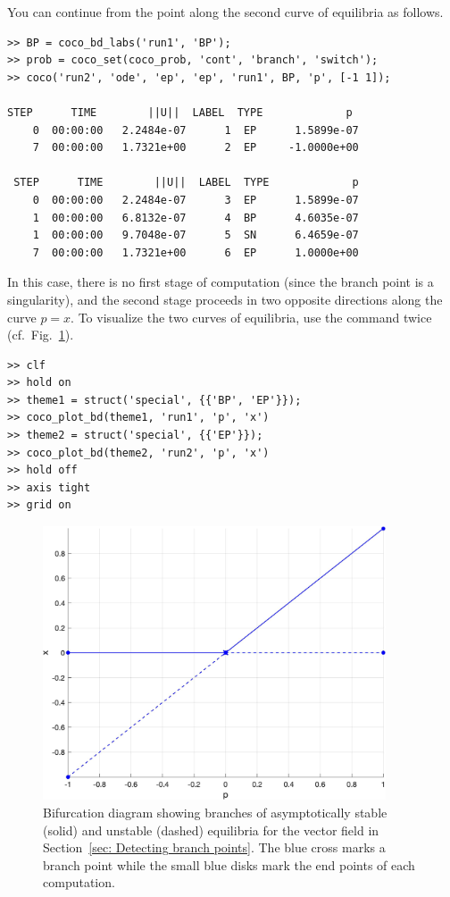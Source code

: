 You can continue from the  point along the second curve of equilibria as follows.
\begin{lstlisting}[language=coco-highlight,frame=lines]
>> BP = coco_bd_labs('run1', 'BP');
>> prob = coco_set(coco_prob, 'cont', 'branch', 'switch');
>> coco('run2', 'ode', 'ep', 'ep', 'run1', BP, 'p', [-1 1]);

STEP      TIME        ||U||  LABEL  TYPE             p
    0  00:00:00   2.2484e-07      1  EP      1.5899e-07
    7  00:00:00   1.7321e+00      2  EP     -1.0000e+00

 STEP      TIME        ||U||  LABEL  TYPE             p
    0  00:00:00   2.2484e-07      3  EP      1.5899e-07
    1  00:00:00   6.8132e-07      4  BP      4.6035e-07
    1  00:00:00   9.7048e-07      5  SN      6.4659e-07
    7  00:00:00   1.7321e+00      6  EP      1.0000e+00
\end{lstlisting}
In this case, there is no first stage of computation (since the branch point is a singularity), and the second stage proceeds in two opposite directions along the curve $p=x$. To visualize the two curves of equilibria, use the  command twice (cf.\ Fig.~\ref{fig: Section3_2_1}).
\begin{lstlisting}[language=coco-highlight,frame=lines]
>> clf
>> hold on
>> theme1 = struct('special', {{'BP', 'EP'}});
>> coco_plot_bd(theme1, 'run1', 'p', 'x')
>> theme2 = struct('special', {{'EP'}});
>> coco_plot_bd(theme2, 'run2', 'p', 'x')
>> hold off
>> axis tight
>> grid on
\end{lstlisting}
\begin{figure}[h]
\centering
\includegraphics[width=4in]{Figures/Section3_2_1.jpg}
\caption{Bifurcation diagram showing branches of asymptotically stable (solid) and unstable (dashed) equilibria for the vector field in Section~\ref{sec: Detecting branch points}. The blue cross marks a branch point while the small blue disks mark the end points of each computation.}
\label{fig: Section3_2_1}
\end{figure}

